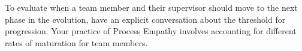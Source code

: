 To evaluate when a team member and their supervisor should move to the next phase in the evolution, have an explicit conversation about the threshold for progression. Your practice of Process Empathy involves accounting for different rates of maturation for team members.





